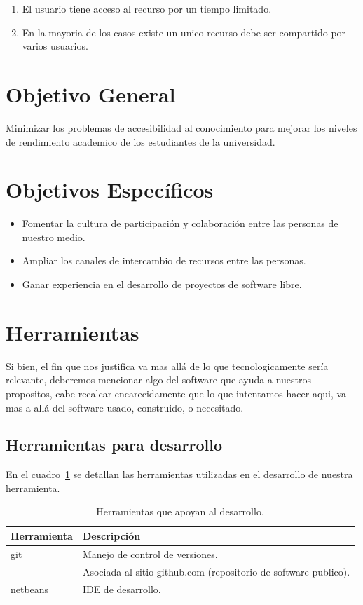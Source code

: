 \documentclass[letter,12pt]{article}
\begin{document}
\begin{enumerate}
\item El usuario tiene acceso al recurso por un tiempo limitado.
\item En la mayoria de los casos existe un unico recurso debe ser compartido por varios usuarios.
\end{enumerate} 

\section{Objetivo General}
Minimizar los problemas de accesibilidad al conocimiento para mejorar los niveles de rendimiento
academico de los estudiantes de la universidad.

\section{Objetivos Específicos}
\begin{itemize}
\item Fomentar la cultura de participación y colaboración entre las personas de nuestro medio.
\item Ampliar los canales de intercambio de recursos entre las personas.
\item Ganar experiencia en el desarrollo de proyectos de software libre.
\end{itemize}

\section{Herramientas}
Si bien, el fin que nos justifica va mas allá de lo que tecnologicamente sería relevante, deberemos
mencionar algo del software que ayuda a nuestros propositos, cabe recalcar encarecidamente que lo
que intentamos hacer aqui, va mas a allá del software usado, construido, o necesitado.

\subsection{Herramientas para desarrollo}
En el cuadro~\ref{herramientas_desarrollo} se detallan las herramientas utilizadas en el desarrollo
de nuestra herramienta.

\begin{table}
\begin{tabular}{l|l}
Herramienta & Descripción \\
\hline
git & Manejo de control de versiones. \\
& Asociada al sitio github.com (repositorio de software publico). \\
netbeans & IDE de desarrollo. \\

\end{tabular}
\caption{Herramientas que apoyan al desarrollo.}
\label{herramientas_desarrollo}
\end{table}
\end{document}
